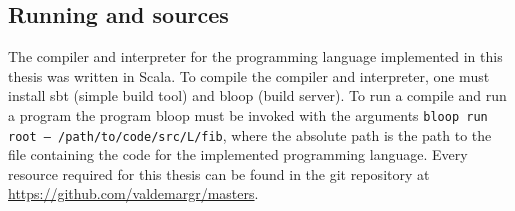 \subsection{Running and sources}
The compiler and interpreter for the programming language implemented in this thesis was written in Scala.
To compile the compiler and interpreter, one must install sbt (simple build tool) and bloop (build server).
To run a compile and run a program the program bloop must be invoked with the arguments \texttt{bloop run root -- /path/to/code/src/L/fib}, where the absolute path is the path to the file containing the code for the implemented programming language.
Every resource required for this thesis can be found in the git repository at \url{https://github.com/valdemargr/masters}.
